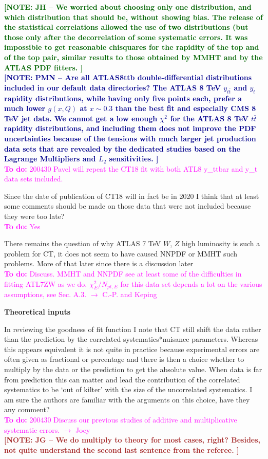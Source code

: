 \documentclass[aps,prd,amsmath,nofootinbib,floatfix,fleqn]{revtex4}
\newcommand{\TODO}[1]{\textcolor{magenta}{
\quad\vspace{3pt} \\ {\bf To do:} #1 \\
}}
\newcommand{\NOTEJH}[1]{\textcolor{darkgreen}{ \bf[NOTE: JH -- #1 ]}}
\newcommand{\NOTEPN}[1]{\textcolor{darkblue}{ \bf[NOTE: PMN -- #1 ]}}
\newcommand{\NOTEJG}[1]{\textcolor{brown}{ \bf[NOTE: JG -- #1 ]}}
\begin{document}
\NOTEJH{We worried about choosing only one distribution, and which distribution that should be, without showing bias. The release of the statistical correlations allowed the use of two distributions (but those only after the decorrelation of some systematic errors. It was impossible to get reasonable chisquares for the rapidity of the top and of the top pair, similar results to those obtained by MMHT and by the ATLAS PDF fitters.}\\
\NOTEPN{Are all ATLAS8ttb double-differential distributions included in our default data directories? The ATLAS 8 TeV $y_{t\bar t}$ and $y_{t}$ rapidity distributions, while having  only five points each, prefer a much lower $g(x,Q)$ at $x\sim 0.3$ than the best fit and especially CMS 8 TeV jet data. We cannot get a low enough $\chi^2$ for the ATLAS 8 TeV $t\bar t$ rapidity distributions, and including them does not improve the PDF uncertainties because of the tensions with much larger jet production data sets that are revealed by the dedicated studies based on the Lagrange Multipliers and $L_2$ sensitivities.}
\TODO{200430 Pavel will repeat the CT18 fit with both ATL8 y\_ttbar and y\_t data sets included.}


\noindent
Since the date of publication of CT18 will in fact be in 2020 I think that at least some comments should be made on those data that were not included because they were too late? 
\TODO{Yes}


\noindent
There remains the question of why ATLAS 7 TeV $W$, $Z$ high luminosity is such a problem for CT, it does not seem to have caused NNPDF or MMHT such problems. More of that later since there is a discussion later
\TODO{Discuss. MMHT and NNPDF see at least some of the difficulties in fitting ATL7ZW as we do. $\chi^2_E/N_{pt,E}$ for this data set depends a lot on the various assumptions, see Sec. A.3. $\to$ C.-P. and Keping}


{\bf Theoretical inputs}


In reviewing the goodness of fit function I note that CT still shift the data rather than the prediction by the correlated systematics*nuisance parameters. Whereas this appears equivalent it is not quite in practice because experimental errors are often given as fractional or percentage and there is then a choice whether to multiply by the data or the prediction to get the absolute value. When data is far from prediction this can matter and lead the contribution of the correlated systematics to be ‘out of kilter’ with the size of the uncorrelated systematics. I am sure the authors are familiar with the arguments on this choice, have they any comment? 
\TODO{200430 Discuss our previous studies of additive and multiplicative systematic errors. $\to$ Joey}
\NOTEJG{We do multiply to theory for most cases, right? Besides, not quite understand the second last sentence from the referee.}
\end{document}
